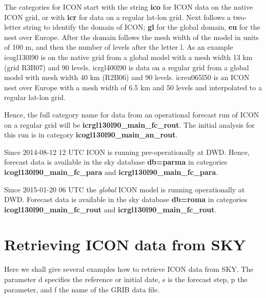 The categories for ICON start with the string \textbf{ico} for ICON data on the native
ICON grid, or with \textbf{icr} for data on a regular lat-lon grid.
Next follows a two-letter string to identify the domain of ICON; \textbf{gl} for the
global domain, \textbf{eu} for the nest over Europe. After the domain follows the
mesh width of the model in units of 100 m, and then the number of levels after the
letter l. As an example icogl130l90 is on the native grid from a global model with a mesh width
13 km (grid R3B07) and 90 levels. icrgl400l90 is data on a regular grid from a global model with
mesh width 40 km (R2B06) and 90 levels. icreu065l50 is an ICON nest over Europe with a
mesh width of 6.5 km and 50 levels and interpolated to a regular lat-lon grid.

Hence, the full category name for data from an operational forecast run of ICON on a
regular grid will be \textbf{icrgl130l90\_main\_fc\_rout}. The initial analysis for this
run is in category \textbf{icogl130l90\_main\_an\_rout}.

\begin{note}
Since 2014-08-12 12 UTC ICON is running pre-operationally at DWD. Hence, forecast data
is available in the sky database \textbf{db=parma} in categories
\textbf{icogl130l90\_main\_fc\_para} and \textbf{icrgl130l90\_main\_fc\_para}.
\end{note}

\begin{note}
Since 2015-01-20 06 UTC the \emph{global} ICON model is running operationally at DWD.
Forecast data is available in the sky database \textbf{db=roma} in categories
\textbf{icogl130l90\_main\_fc\_rout} and \textbf{icrgl130l90\_main\_fc\_rout}.
\end{note}

\section{Retrieving ICON data from SKY}\label{sec_example}

Here we shall give several examples how to retrieve ICON data from SKY.
The parameter d specifies the reference or initial date, s is the forecast step, p the parameter,
and f the name of the GRIB data file.

